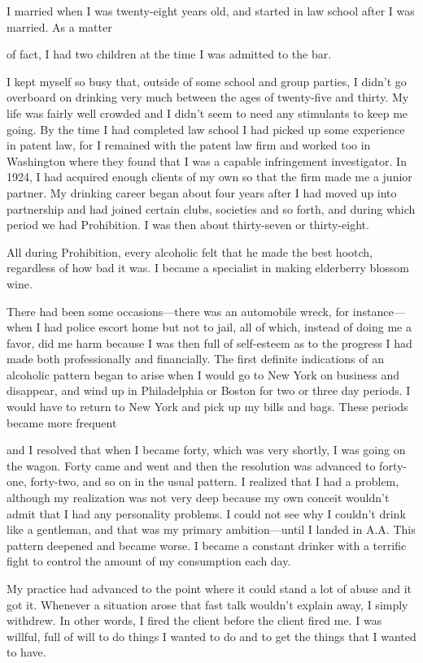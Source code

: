 \begin{biblechapter}
I married when I was twenty-eight years old, and started in law school after I was married. As a matter

of fact, I had two children at the time I was admitted to the bar.

I kept myself so busy that, outside of some school and group parties, I didn’t go overboard on drinking very much between the ages of twenty-five and thirty. My life was fairly well crowded and I didn’t seem to need any stimulants to keep me going. By the time I had completed law school I had picked up some experience in patent law, for I remained with the patent law firm and worked too in Washington where they found that I was a capable infringement investigator. In 1924, I had acquired enough clients of my own so that the firm made me a junior partner. My drinking career began about four years after I had moved up into partnership and had joined certain clubs, societies and so forth, and during which period we had Prohibition. I was then about thirty-seven or thirty-eight.

All during Prohibition, every alcoholic felt that he made the best hootch, regardless of how bad it was. I became a specialist in making elderberry blossom wine.

There had been some occasions—there was an automobile wreck, for instance—when I had police escort home but not to jail, all of which, instead of doing me a favor, did me harm because I was then full of self-esteem as to the progress I had made both professionally and financially. The first definite indications of an alcoholic pattern began to arise when I would go to New York on business and disappear, and wind up in Philadelphia or Boston for two or three day periods. I would have to return to New York and pick up my bills and bags. These periods became more frequent

and I resolved that when I became forty, which was very shortly, I was going on the wagon. Forty came and went and then the resolution was advanced to forty-one, forty-two, and so on in the usual pattern. I realized that I had a problem, although my realization was not very deep because my own conceit wouldn’t admit that I had any personality problems. I could not see why I couldn’t drink like a gentleman, and that was my primary ambition—until I landed in A.A. This pattern deepened and became worse. I became a constant drinker with a terrific fight to control the amount of my consumption each day.

My practice had advanced to the point where it could stand a lot of abuse and it got it. Whenever a situation arose that fast talk wouldn’t explain away, I simply withdrew. In other words, I fired the client before the client fired me. I was willful, full of will to do things I wanted to do and to get the things that I wanted to have.


\end{biblechapter}
